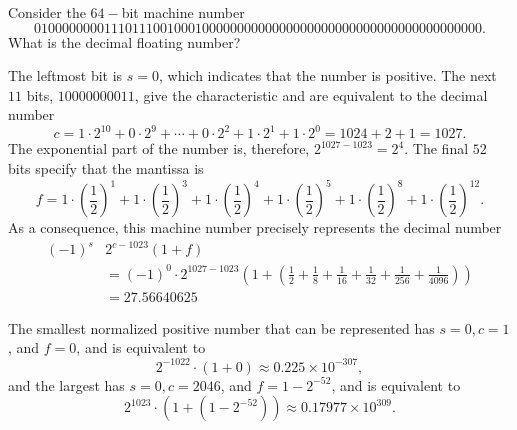 \begin{example}
Consider the $64-$bit machine number
\[0100000000111011100100010000000000000000000000000000000000000000.\]
What is the decimal floating number?
\end{example}
\begin{mysolution}
The leftmost bit is $s=0$, which indicates that the number is positive. The next $11$ bits, $10000000011$, give the characteristic and are equivalent to the decimal number
\[c=1 \cdot 2^{10}+0 \cdot 2^{9}+\cdots+0 \cdot 2^{2}+1 \cdot 2^{1}+1 \cdot 2^{0}=1024+2+1=1027.\]
The exponential part of the number is, therefore, $2^{1027-1023}=2^{4}$. The final $52$ bits specify that the mantissa is
\[f=1 \cdot\left(\frac{1}{2}\right)^{1}+1 \cdot\left(\frac{1}{2}\right)^{3}+1 \cdot\left(\frac{1}{2}\right)^{4}+1 \cdot\left(\frac{1}{2}\right)^{5}+1 \cdot\left(\frac{1}{2}\right)^{8}+1 \cdot\left(\frac{1}{2}\right)^{12}.\]
As a consequence, this machine number precisely represents the decimal number
\[\begin{array}{rl}
(-1)^{s} & 2^{c-1023} (1+f) \\
& =(-1)^{0} \cdot 2^{1027-1023}\left(1+\left(\frac{1}{2}+\frac{1}{8}+\frac{1}{16}+\frac{1}{32}+\frac{1}{256}+\frac{1}{4096}\right)\right) \\
& =27.56640625
\end{array}\]
\end{mysolution}

The smallest normalized positive number that can be represented has $s=0, c=1$, and $f=0$, and is equivalent to 
\[2^{-1022} \cdot(1+0) \approx 0.225 \times 10^{-307},\]
and the largest has $s=0, c=2046$, and $f=1-2^{-52}$, and is equivalent to 
\[2^{1023} \cdot\left(1+\left(1-2^{-52}\right)\right) \approx 0.17977 \times 10^{309}.\]

